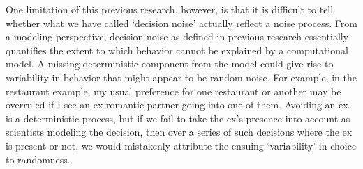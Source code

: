\documentclass[12pt]{article}
\begin{document}
{	One limitation of this previous research, however, is that it is difficult to tell whether what we have called `decision noise' actually reflect a noise process. From a modeling perspective, decision noise as defined in previous research essentially quantifies the extent to which behavior  cannot be explained by a computational model. A missing deterministic component from the model could give rise to variability in behavior that might appear to be random noise. For example, in the restaurant example, my usual preference for one restaurant or another may be overruled if I see an ex romantic partner going into one of them. Avoiding an ex is a deterministic process, but if we fail to take the ex's presence into account as scientists modeling the decision, then over a series of such decisions where the ex is present or not, we would mistakenly attribute the ensuing `variability' in choice to randomness. 
	
	
	
	
}
\end{document}
